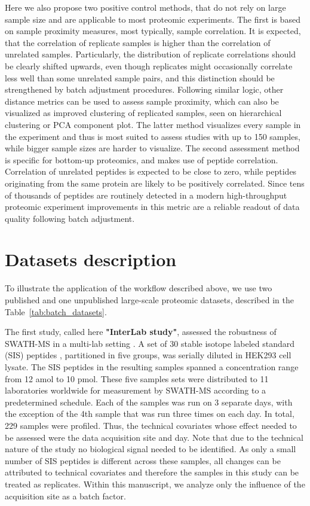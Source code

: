 \documentclass[num-refs]{wiley-article}
\begin{document}
Here we also propose two positive control methods, that do not rely on large sample size and are applicable to most proteomic experiments. The first is based on sample proximity measures, most typically, sample correlation. It is expected, that the correlation of replicate samples  is higher than the correlation of unrelated samples. Particularly, the distribution of replicate correlations should be clearly shifted upwards, even though replicates might occasionally correlate less well than some unrelated sample pairs, and this distinction should be strengthened by batch adjustment procedures. Following similar logic, other distance metrics can be used to assess sample proximity, which can also be visualized as improved clustering of replicated samples, seen on hierarchical clustering or PCA component plot. The latter method visualizes every sample in the experiment and thus is most suited to assess studies with up to 150 samples, while bigger sample sizes are harder to visualize.
The second assessment method is specific for bottom-up proteomics, and makes use of peptide correlation. Correlation of unrelated peptides is expected to be close to zero, while peptides originating from the same protein are likely to be positively correlated. Since tens of thousands of peptides are routinely detected in a modern high-throughput proteomic experiment improvements in this metric are a reliable readout of data quality following batch adjustment.

\section{Datasets description}\label{subsec:datasets}

To illustrate the application of the workflow described above, we use two published and one unpublished large-scale proteomic datasets, described in the Table~\ref{tab:batch_datasets}. 

The first study, called here \textbf{"InterLab study"}, assessed the robustness of SWATH-MS in a multi-lab setting \cite{Collins2017}. A set of 30 stable isotope labeled standard (SIS) peptides \cite{Ebhardt2012}, partitioned in five groups, was serially diluted in HEK293 cell lysate. The SIS peptides in the resulting samples spanned a concentration range from 12 amol to 10 pmol. These five samples sets were distributed to 11 laboratories worldwide for measurement by SWATH-MS according to a predetermined schedule. Each of the samples was run on 3 separate days, with the exception of the 4th sample that was run three times on each day. In total, 229 samples were profiled. Thus, the technical covariates whose effect needed to be assessed were the data acquisition site and day. Note that due to the technical nature of the study no biological signal needed to be identified. As only a small number of SIS peptides is different across these samples, all changes can be attributed to technical covariates and therefore the samples in this study can be treated as replicates. Within this manuscript, we analyze only the influence of the acquisition site as a batch factor.
\end{document}
